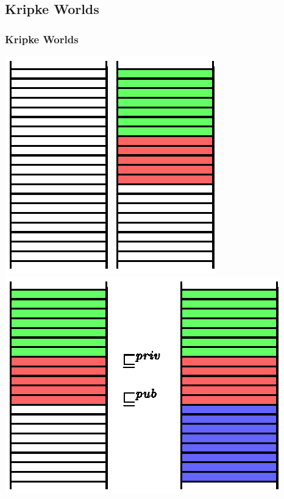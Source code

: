 \documentclass{beamer}
\begin{document}
\subsection{Kripke Worlds}
\begin{frame}
  \frametitle{Kripke Worlds}
  \begin{overprint}
    \includegraphics{Worlds/w1.eps}
    \includegraphics{Worlds/w2.eps}
    \includegraphics{Worlds/w3.eps}

\end{overprint}
\end{frame}
\end{document}
